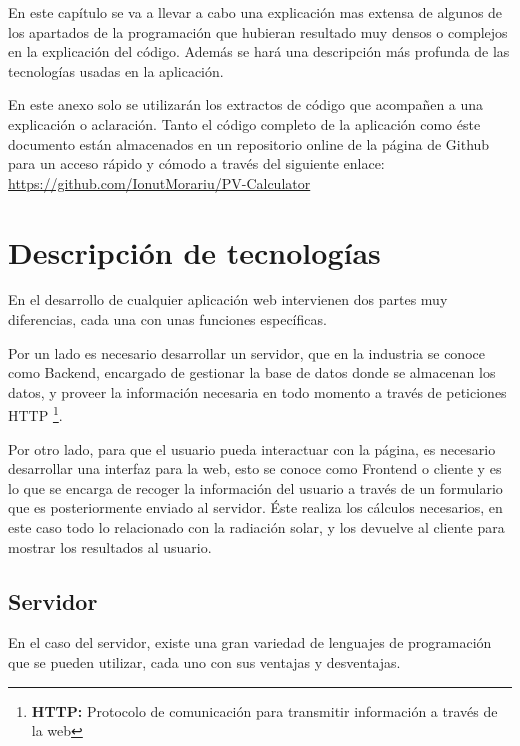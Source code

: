En este capítulo se va a llevar a cabo una explicación mas extensa de algunos de los apartados de la programación que hubieran resultado muy densos o complejos en la explicación del código. Además se hará una descripción más profunda de las tecnologías usadas en la aplicación.

En este anexo solo se utilizarán los extractos de código que acompañen a una explicación o aclaración. Tanto el código completo de la aplicación como éste documento están almacenados en un repositorio online de la página de Github para un acceso rápido y cómodo a través del siguiente enlace: \url{https://github.com/IonutMorariu/PV-Calculator}

\section{Descripción de tecnologías}

En el desarrollo de cualquier aplicación web intervienen dos partes muy diferencias, cada una con unas funciones específicas. 

Por un lado es necesario desarrollar un servidor, que en la industria se conoce como Backend, encargado de gestionar la base de datos donde se almacenan los datos, y proveer la información necesaria en todo momento a través de peticiones HTTP \footnote{ \textbf{HTTP:} Protocolo de comunicación para transmitir información a través de la web}.

Por otro lado, para que el usuario pueda interactuar con la página, es necesario desarrollar una interfaz para la web, esto se conoce como Frontend o cliente y es lo que se encarga de recoger la información del usuario a través de un formulario que es posteriormente enviado al servidor. Éste realiza los cálculos necesarios, en este caso todo lo relacionado con la radiación solar, y los devuelve al cliente para mostrar los resultados al usuario.

\subsection{Servidor}

En el caso del servidor, existe una gran variedad de lenguajes de programación que se pueden utilizar, cada uno con sus ventajas y desventajas.


